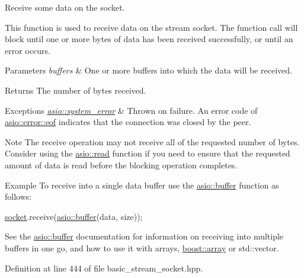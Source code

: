 Receive some data on the socket. 

This function is used to receive data on the stream socket. The function call will block until one or more bytes of data has been received successfully, or until an error occurs.


\begin{DoxyParams}{Parameters}
{\em buffers} & One or more buffers into which the data will be received.\\
\hline
\end{DoxyParams}
\begin{DoxyReturn}{Returns}
The number of bytes received.
\end{DoxyReturn}

\begin{DoxyExceptions}{Exceptions}
{\em \hyperlink{classasio_1_1system__error}{asio\+::system\+\_\+error}} & Thrown on failure. An error code of \hyperlink{namespaceasio_1_1error_ade61a402d1dfb10b1c223906f5ea7847abb0b3b47deff67dd67b180d9d1e34154}{asio\+::error\+::eof} indicates that the connection was closed by the peer.\\
\hline
\end{DoxyExceptions}
\begin{DoxyNote}{Note}
The receive operation may not receive all of the requested number of bytes. Consider using the \hyperlink{group__read}{asio\+::read} function if you need to ensure that the requested amount of data is read before the blocking operation completes.
\end{DoxyNote}
\begin{DoxyParagraph}{Example}
To receive into a single data buffer use the \hyperlink{group__buffer}{asio\+::buffer} function as follows\+: 
\begin{DoxyCode}
\hyperlink{namespacewebsocketpp_1_1transport_1_1asio_1_1socket_1_1error_a828ddaa5ed63a761e1b557465a35f05aa0c31b356014843e1d09514e794a539a7}{socket}.receive(\hyperlink{group__buffer_ga1ed66e401559cbfd19595392f653b47c}{asio::buffer}(data, size));
\end{DoxyCode}
 See the \hyperlink{group__buffer}{asio\+::buffer} documentation for information on receiving into multiple buffers in one go, and how to use it with arrays, \hyperlink{classboost_1_1array}{boost\+::array} or std\+::vector. 
\end{DoxyParagraph}


Definition at line 444 of file basic\+\_\+stream\+\_\+socket.\+hpp.

\hypertarget{classasio_1_1basic__stream__socket_a68abffc3fc471f0dbf194f68dfef7e5c}{}
